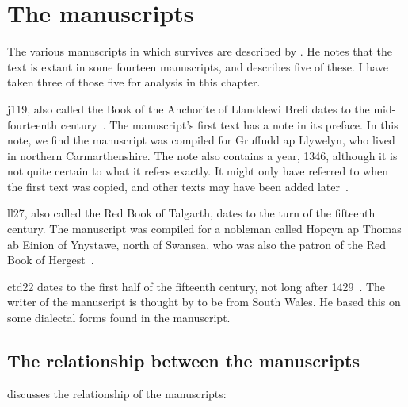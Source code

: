 \section{The manuscripts}
\label{sec:manuscripts-1}

The various manuscripts in which  survives are described by \textcite[lv--lviii]{Eva_Welsh88}. He notes that the text is extant in some fourteen manuscripts, and describes five of these. I have taken three of those five for analysis in this chapter.

\Acrlong{j119}, also called the Book of the Anchorite of Llanddewi Brefi dates to the mid-fourteenth century~\autocite{Tho_TEI13}. The manuscript's first text has a note in its preface. In this note, we find the manuscript was compiled for Gruffudd ap Llywelyn, who lived in northern Carmarthenshire. The note also contains a year, 1346, although it is not quite certain to what it refers exactly. It might only have referred to when the first text was copied, and other texts may have been added later~\autocite[lvi--lvii]{Eva_Welsh88}.

\Acrlong{ll27}, also called the Red Book of Talgarth, dates to the turn of the fifteenth century. The manuscript was compiled for a nobleman called Hopcyn ap Thomas ab Einion of Ynystawe, north of Swansea, who was also the patron of the Red Book of Hergest~\autocite[lvii]{Eva_Welsh88}.

\Acrlong{ctd22} dates to the first half of the fifteenth century, not long after 1429~\autocite{Eva_Welsh88}. The writer of the manuscript is thought by \textcite[107]{Pow_description81} to be from South Wales. He based this on some dialectal forms found in the manuscript.

\subsection{The relationship between the manuscripts}
\label{sec:relat-betw-manuscr}
\textcite{Eva_Welsh88} discusses the relationship of the manuscripts:


